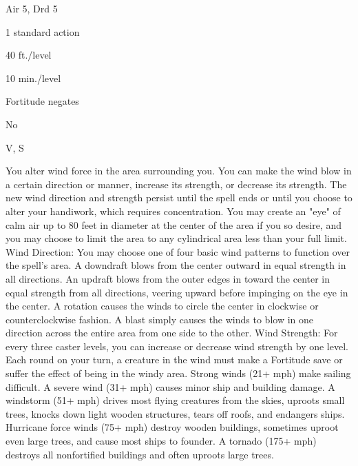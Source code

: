 
\begin{description*}
\item[Level:] Air 5, Drd 5
\item[Casting Time:] 1 standard action
\item[Range:] 40 ft./level
\item[Duration:] 10 min./level
\item[Saving Throw:] Fortitude negates
\item[Spell Resistance:] No
\item[Components:] V, S
\end{description*}

You alter wind force in the area surrounding you. You can make the wind blow in
a certain direction or manner, increase its strength, or decrease its strength.
The new wind direction and strength persist until the spell ends or until you choose
to alter your handiwork, which requires concentration. You may create an "eye"
of calm air up to 80 feet in diameter at the center of the area if you so desire,
and you may choose to limit the area to any cylindrical area less than your full
limit.
Wind Direction: You may choose one of four basic wind patterns to function
over the spell's area.%
A downdraft blows from the center outward in equal strength in all directions.%
An updraft blows from the outer edges in toward the center in equal strength from
all directions, veering upward before impinging on the eye in the center.%
A rotation causes the winds to circle the center in clockwise or counterclockwise
fashion.%
A blast simply causes the winds to blow in one direction across the entire area
from one side to the other.
Wind Strength: For every three caster levels, you can increase or decrease
wind strength by one level. Each round on your turn, a creature in the wind must
make a Fortitude save or suffer the effect of being in the windy area.
Strong winds (21+ mph) make sailing difficult.
A severe wind (31+ mph) causes minor ship and building damage.
A windstorm (51+ mph) drives most flying creatures from the skies, uproots small
trees, knocks down light wooden structures, tears off roofs, and endangers ships.
Hurricane force winds (75+ mph) destroy wooden buildings, sometimes uproot even
large trees, and cause most ships to founder.
A tornado (175+ mph) destroys all nonfortified buildings and often uproots large
trees.